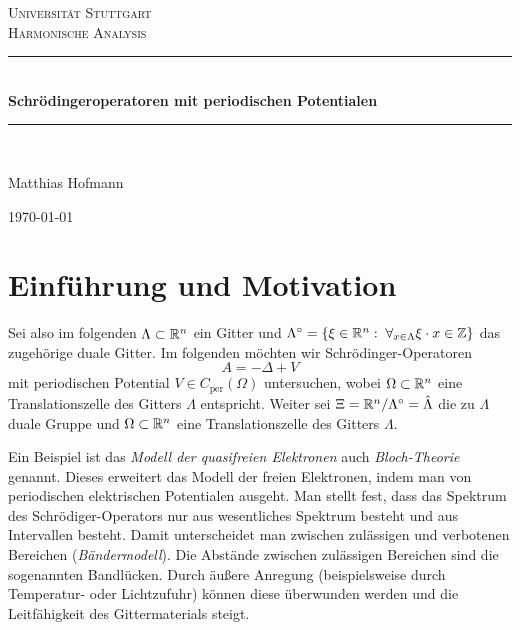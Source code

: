 \documentclass{mywork}
\begin{document}
\begin{titlepage}

\begin{center}



\textsc{\LARGE Universität Stuttgart}\\[1.5cm]

\textsc{\Large Harmonische Analysis}\\[0.5cm]


\newcommand{\HRule}{\rule{\linewidth}{0.5mm}}
\HRule \\[0.4cm]
{ \huge \bfseries Schrödingeroperatoren mit periodischen Potentialen}\\[0.4cm]

\HRule \\[1.5cm]


\begin{center} \Large
Matthias Hofmann
\end{center}

\hfill

\vfill

{\large \today}

\end{center}

\end{titlepage}
\section{Einführung und Motivation}
Sei also im folgenden $\Lambda \subset \mathbb{R}^n$ ein Gitter und $\Lambda^\circ= \{\xi \in \R^n: \forall_{x\in \Lambda} \xi \cdot x \in \Z\}$ das zugehörige duale Gitter. Im folgenden möchten wir Schrödinger-Operatoren 
$$ A=- \Delta + V$$
mit periodischen Potential $V\in C_{\text{per}}(\Omega)$ untersuchen, wobei $\Omega \subset \mathbb{R}^n$ eine Translationszelle des Gitters $\Lambda$ entspricht.   Weiter sei $\Xi= \mathbb{R}^n/ \Lambda^\circ= \hat \Lambda$ die zu $\Lambda$ duale Gruppe und $\Omega\subset \mathbb{R}^n$ eine Translationszelle des Gitters $\Lambda$.

Ein Beispiel ist das \emph{Modell der quasifreien Elektronen} auch \emph{Bloch-Theorie} genannt.  Dieses erweitert das Modell  der freien Elektronen, indem man von periodischen elektrischen Potentialen ausgeht. Man stellt fest, dass das Spektrum des Schrödiger-Operators nur aus wesentliches Spektrum besteht und aus Intervallen besteht.  Damit unterscheidet man zwischen zulässigen und verbotenen Bereichen (\emph{Bändermodell}).  Die Abstände zwischen zulässigen Bereichen sind die sogenannten Bandlücken.   Durch äußere Anregung (beispielsweise durch Temperatur- oder Lichtzufuhr) können diese überwunden werden und die Leitfähigkeit des Gittermaterials steigt.
\end{document}
